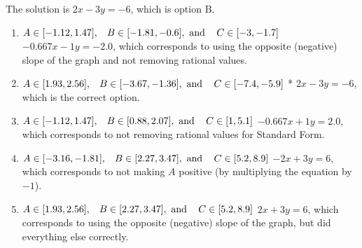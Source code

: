 \documentclass{extbook}[14pt]
\begin{document}
\begin{enumerate}
{The solution is \( 2x - 3y = -6 \), which is option B.\begin{enumerate}[label=\Alph*.]
\item \( A \in [-1.12, 1.47], \hspace{3mm} B \in [-1.81, -0.6], \text{ and } \hspace{3mm} C \in [-3, -1.7] \)
 $-0.667x - 1y = -2.0$, which corresponds to using the opposite (negative) slope of the graph and not removing rational values.
\item \( A \in [1.93, 2.56], \hspace{3mm} B \in [-3.67, -1.36], \text{ and } \hspace{3mm} C \in [-7.4, -5.9] \)
* $2x - 3y = -6$, which is the correct option.
\item \( A \in [-1.12, 1.47], \hspace{3mm} B \in [0.88, 2.07], \text{ and } \hspace{3mm} C \in [1, 5.1] \)
 $-0.667x + 1y = 2.0$, which corresponds to not removing rational values for Standard Form.
\item \( A \in [-3.16, -1.81], \hspace{3mm} B \in [2.27, 3.47], \text{ and } \hspace{3mm} C \in [5.2, 8.9] \)
 $-2x + 3y = 6$, which corresponds to not making $A$ positive (by multiplying the equation by $-1$).
\item \( A \in [1.93, 2.56], \hspace{3mm} B \in [2.27, 3.47], \text{ and } \hspace{3mm} C \in [5.2, 8.9] \)
 $2x + 3y = 6$, which corresponds to using the opposite (negative) slope of the graph, but did everything else correctly.
\end{enumerate}

}
\end{enumerate}
\end{document}
